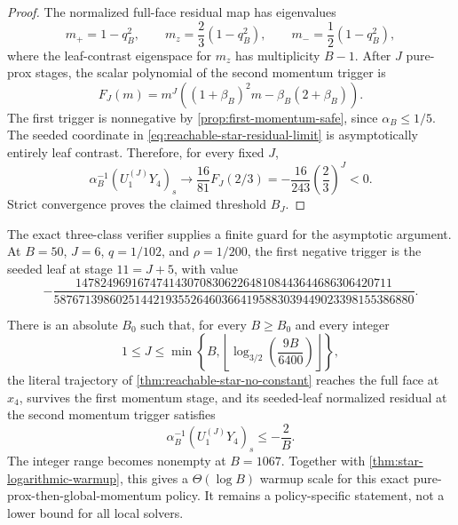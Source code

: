 \documentclass[11pt]{article}
\begin{document}
\begin{proof}
The normalized full-face residual map has eigenvalues
\begin{equation}
 m_+=1-q_B^2,\qquad m_z=\frac23(1-q_B^2),\qquad
 m_- =\frac12(1-q_B^2),
 \label{eq:reachable-star-three-modes}
\end{equation}
where the leaf-contrast eigenspace for $m_z$ has multiplicity $B-1$.  After
$J$ pure-prox stages, the scalar polynomial of the second momentum trigger is
\begin{equation}
 F_J(m)=m^J\left((1+\beta_B)^2m-\beta_B(2+\beta_B)\right).
 \label{eq:reachable-star-second-trigger-polynomial}
\end{equation}
The first trigger is nonnegative by \cref{prop:first-momentum-safe}, since
$\alpha_B\leq1/5$.  The seeded coordinate in
\eqref{eq:reachable-star-residual-limit} is asymptotically entirely leaf
contrast.  Therefore, for every fixed $J$,
\begin{equation}
 \alpha_B^{-1}(U_1^{(J)}Y_4)_s
 \longrightarrow
 \frac{16}{81}F_J(2/3)
 =-\frac{16}{243}\left(\frac23\right)^J<0.
 \label{eq:reachable-star-negative-limit}
\end{equation}
Strict convergence proves the claimed threshold $B_J$.
\end{proof}

The exact three-class verifier supplies a finite guard for the asymptotic
argument.  At $B=50$, $J=6$, $q=1/102$, and $\rho=1/200$, the first negative
trigger is the seeded leaf at stage $11=J+5$, with value
\begin{equation}
 -\frac{147824969167474143070830622648108443644686306420711}
 {5876713986025144219355264603664195883039449023398155386880}.
 \label{eq:reachable-star-b50-witness}
\end{equation}

\begin{theorem}
\label{thm:reachable-star-logarithmic-lower}
There is an absolute $B_0$ such that, for every $B\geq B_0$ and every integer
\begin{equation}
 1\leq J\leq
 \min\left\{B,
 \left\lfloor\log_{3/2}\!\left(\frac{9B}{6400}\right)\right\rfloor
 \right\},
 \label{eq:reachable-star-logarithmic-lower-range}
\end{equation}
the literal trajectory of \cref{thm:reachable-star-no-constant} reaches the
full face at $x_4$, survives the first momentum stage, and its seeded-leaf
normalized residual at the second momentum trigger satisfies
\begin{equation}
 \alpha_B^{-1}(U_1^{(J)}Y_4)_s\leq-\frac{2}{B}.
 \label{eq:reachable-star-logarithmic-lower-margin}
\end{equation}
The integer range becomes nonempty at $B=1067$.  Together with
\cref{thm:star-logarithmic-warmup}, this gives a $\Theta(\log B)$ warmup
scale for this exact pure-prox-then-global-momentum policy.  It remains a
policy-specific statement, not a lower bound for all local solvers.
\end{theorem}
\end{document}
